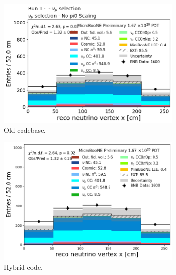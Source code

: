 \begin{figure}[H]
    \centering
    \begin{subfigure}[t]{0.32\linewidth}
        \includegraphics[width=\linewidth]{technote/Appendix_Validation/Figures/Numu/Run1_Vertex_X_Old.png}
        \caption{Old codebase.}
    \end{subfigure}%
    \hspace{0.2cm}%
    \begin{subfigure}[t]{0.32\linewidth}
        \includegraphics[width=\linewidth]{technote/Appendix_Validation/Figures/Numu/Run1_Vertex_X_Chris.png}
        \caption{Hybrid code.}
    \end{subfigure}%
    \hspace{0.2cm}%
    \begin{subfigure}[t]{0.32\linewidth}

\end{subfigure}
\end{figure}
